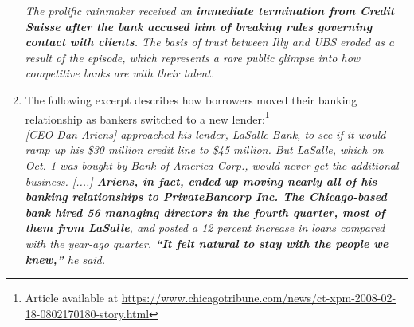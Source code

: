 \begin{enumerate}
		\textit{The prolific rainmaker received an \textbf{immediate termination from Credit Suisse after the bank accused him of breaking rules governing contact with clients}. The basis of trust between Illy and UBS eroded as a result of the episode, which represents a rare public glimpse into how competitive banks are with their talent.}
\vspace{1em}

	\item The following excerpt describes how borrowers moved their banking relationship as bankers switched to a new lender:\footnote{Article available at 	\url{https://www.chicagotribune.com/news/ct-xpm-2008-02-18-0802170180-story.html}}\\

		\textit{[CEO Dan Ariens] approached his lender, LaSalle Bank, to see if it would ramp up his \$30 million credit line to \$45 million. But LaSalle, which on Oct. 1 was bought by Bank of America Corp., would never get the additional business. [....] \textbf{Ariens, in fact, ended up moving nearly all of his banking relationships to PrivateBancorp Inc. The Chicago-based bank hired 56 managing directors in the fourth quarter, most of them from LaSalle}, and posted a 12 percent increase in loans compared with the year-ago quarter. \textbf{``It felt natural to stay with the people we knew,''} he said.}
\vspace{1em}


\end{enumerate}

\clearpage

